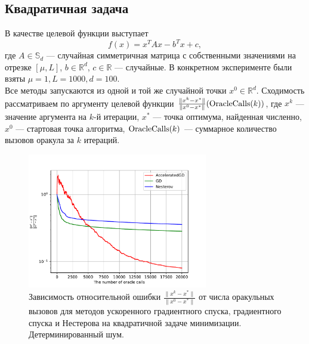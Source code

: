 \documentclass{article}
\begin{document}
\subsection{Квадратичная задача}
В качестве целевой функции выступает
\begin{equation}
 f(x) = x^T A x - b^T x + c,
\end{equation}
где $A \in \mathbb{S}_d$ --- случайная симметричная матрица с собственными значениями на отрезке $[\mu, L]$, $b \in \mathbb{R}^d$, $c \in \mathbb{R}$ --- случайные. В конкретном эксперименте были взяты $\mu = 1, L = 1000, d = 100$.\\
Все методы запускаются из одной и той же случайной точки $x^0 \in \mathbb{R}^d$.
Сходимость рассматриваем по аргументу целевой функции $\frac{\|x^k - x^*\|}{\|x^0 - x^*\|}(\textnormal{OracleCalls}(k))$, где $x^k$ --- значение аргумента на $k$-й итерации, $x^*$ --- точка оптимума, найденная численно, $x^0$ --- стартовая точка алгоритма, $\textnormal{OracleCalls}(k)$ --- суммарное количество вызовов оракула за $k$ итераций.
\begin{figure}[!htbp]
\centering
  \includegraphics[width=0.7\textwidth]{../figures/Deterministic_quadratic_AGD_GD_Nesterov_18.pdf}
 \caption{Зависимость относительной ошибки $\frac{\|x^k - x^*\|}{\|x^0 - x^*\|}$ от числа оракульных вызовов для методов ускоренного градиентного спуска, градиентного спуска и Нестерова на квадратичной задаче минимизации. Детерминированный шум.}
  \label{fig:non-stochastic_quadratic}
\end{figure}
\end{document}
